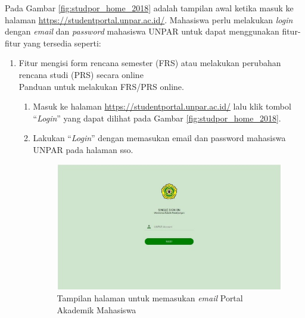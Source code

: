 Pada Gambar \ref{fig:studpor_home_2018} adalah tampilan awal ketika masuk ke halaman \url{https://studentportal.unpar.ac.id/}. Mahasiswa perlu melakukan \textit{login} dengan \textit{email} dan \textit{password} mahasiswa UNPAR untuk dapat menggunakan fitur-fitur yang tersedia seperti:
\begin{enumerate}
	\item Fitur mengisi form rencana semester (FRS) atau melakukan perubahan rencana studi (PRS) secara online \\
	Panduan untuk melakukan FRS/PRS online.
	\begin{enumerate}
		\item Masuk ke halaman \url{https://studentportal.unpar.ac.id/} lalu klik tombol ``\textit{Login}'' yang dapat dilihat pada Gambar \ref{fig:studpor_home_2018}.
		\item Lakukan ``\textit{Login}'' dengan memasukan email dan password mahasiswa UNPAR pada halaman sso.
		\begin{figure}[H]
			\centering
			\includegraphics[scale=0.7]{Gambar/sso2018.jpg}
			\caption{Tampilan halaman untuk memasukan \textit{email} Portal Akademik Mahasiswa} 
			\label{fig:sso_2018}
		\end{figure}
		

\end{enumerate}
\end{enumerate}
